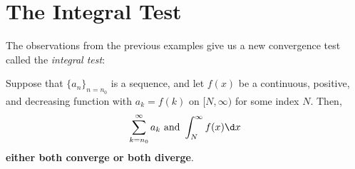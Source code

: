 \documentclass{ximera}
\begin{document}
\section{The Integral Test}
The observations from the previous examples give us a new convergence test called the \textit{integral test}:
\begin{theorem}
  Suppose that $\{a_n\}_{n=n_0}$ is a sequence, and let $f(x)$ be a continuous, positive, and decreasing function
    with $a_k = f(k)$ on $[N,\infty)$ for some index $N$.  Then, 
    \[
    \sum_{k=n_0}^\infty a_k\text{ and }\int_N^\infty f(x) \d x
    \]
    \textbf{either both converge or both diverge}.
\end{theorem}

%
\end{document}
